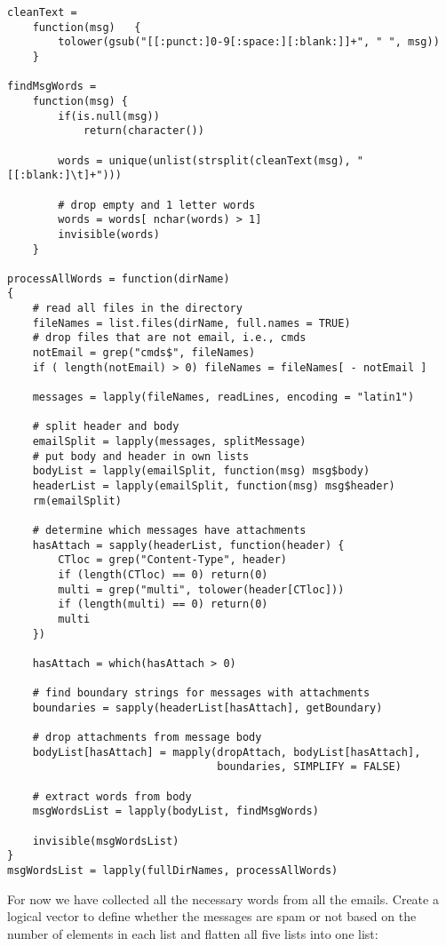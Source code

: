 \documentclass{article}
\begin{document}
\begin{verbatim}
cleanText =
    function(msg)   {
        tolower(gsub("[[:punct:]0-9[:space:][:blank:]]+", " ", msg))
    }

findMsgWords = 
    function(msg) {
        if(is.null(msg))
            return(character())
        
        words = unique(unlist(strsplit(cleanText(msg), "[[:blank:]\t]+")))
        
        # drop empty and 1 letter words
        words = words[ nchar(words) > 1]
        invisible(words)
    }

processAllWords = function(dirName)
{
    # read all files in the directory
    fileNames = list.files(dirName, full.names = TRUE)
    # drop files that are not email, i.e., cmds
    notEmail = grep("cmds$", fileNames)
    if ( length(notEmail) > 0) fileNames = fileNames[ - notEmail ]
    
    messages = lapply(fileNames, readLines, encoding = "latin1")
    
    # split header and body
    emailSplit = lapply(messages, splitMessage)
    # put body and header in own lists
    bodyList = lapply(emailSplit, function(msg) msg$body)
    headerList = lapply(emailSplit, function(msg) msg$header)
    rm(emailSplit)
    
    # determine which messages have attachments
    hasAttach = sapply(headerList, function(header) {
        CTloc = grep("Content-Type", header)
        if (length(CTloc) == 0) return(0)
        multi = grep("multi", tolower(header[CTloc])) 
        if (length(multi) == 0) return(0)
        multi
    })
    
    hasAttach = which(hasAttach > 0)
    
    # find boundary strings for messages with attachments
    boundaries = sapply(headerList[hasAttach], getBoundary)
    
    # drop attachments from message body
    bodyList[hasAttach] = mapply(dropAttach, bodyList[hasAttach], 
                                 boundaries, SIMPLIFY = FALSE)
    
    # extract words from body
    msgWordsList = lapply(bodyList, findMsgWords)
    
    invisible(msgWordsList)
}
msgWordsList = lapply(fullDirNames, processAllWords)  
\end{verbatim}

For now we have collected all the necessary words from all the emails. Create a logical vector to define whether the messages are spam or not based on the number of elements in each list and flatten all five lists into one list:
\end{document}
